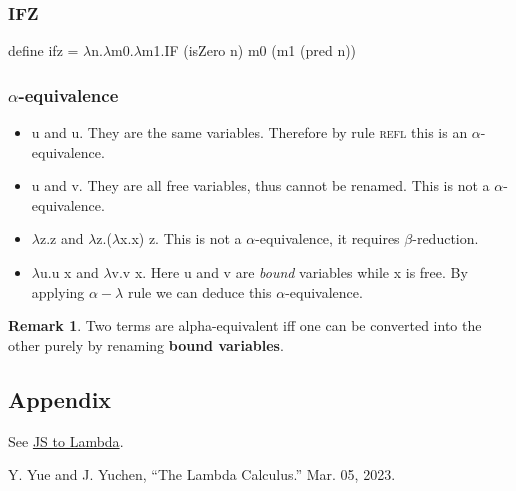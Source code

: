 \documentclass{article}
\theoremstyle{definition}
\newtheorem*{remark}{Remark}
\begin{document}
\subsubsection*{IFZ}

\begin{tcolorbox}
    \textsf{define} ifz = $\lambda$n.$\lambda$m0.$\lambda$m1.IF (isZero n) m0 (m1 (pred n))
\end{tcolorbox}

\subsubsection*{$\alpha$-equivalence}

\begin{itemize}
    \item u and u. They are the same variables.
          Therefore by rule \textsc{refl} this is an $\alpha$-equivalence.
    \item u and v. They are all free variables, thus cannot be renamed. This is not a $\alpha$-equivalence.
    \item $\lambda$z.z and $\lambda$z.($\lambda$x.x) z. This is not a $\alpha$-equivalence, it requires $\beta$-reduction.
    \item $\lambda$u.u x and $\lambda$v.v x. Here u and v are \emph{bound} variables while x is free. By applying $\alpha-\lambda$ rule we can deduce this $\alpha$-equivalence.
\end{itemize}

\begin{remark}
    Two terms are alpha-equivalent iff one can be converted into the other purely by renaming \textbf{bound variables}.
\end{remark}

\subsection*{Appendix}
See \href{https://linsyking.github.io/lambda-playground/lambda.html?source=gist:93613afa70a3065aa03a989e5e7b537d}{JS to Lambda}.

\begin{thebibliography}{9}
     Y. Yue and J. Yuchen, “The Lambda Calculus.” Mar. 05, 2023.
\end{thebibliography}
\end{document}
